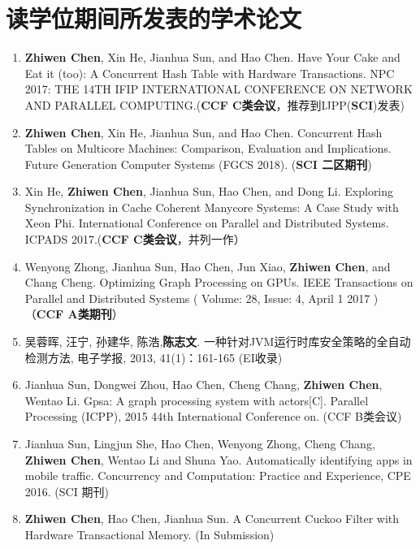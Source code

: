 \chapter{读学位期间所发表的学术论文}

\begin{enumerate}
\item \textbf{Zhiwen Chen}, Xin He, Jianhua Sun, and Hao Chen. Have Your Cake and Eat it (too): A Concurrent Hash Table with Hardware Transactions. NPC 2017: THE 14TH IFIP INTERNATIONAL CONFERENCE ON NETWORK AND PARALLEL COMPUTING.(\textbf{CCF C类会议}，推荐到IJPP(\textbf{SCI})发表)
\item \textbf{Zhiwen Chen}, Xin He, Jianhua Sun, and Hao Chen. Concurrent Hash Tables on Multicore Machines: Comparison, Evaluation and Implications. Future Generation Computer Systems (FGCS 2018). (\textbf{SCI 二区期刊})
\item Xin He, \textbf{Zhiwen Chen}, Jianhua Sun, Hao Chen, and Dong Li. Exploring Synchronization in Cache Coherent Manycore Systems: A Case Study with Xeon Phi. International Conference on Parallel and Distributed Systems. ICPADS 2017.(\textbf{CCF C类会议}，并列一作）
\item Wenyong Zhong, Jianhua Sun, Hao Chen, Jun Xiao, \textbf{Zhiwen Chen}, and Chang Cheng. Optimizing Graph Processing on GPUs. IEEE Transactions on Parallel and Distributed Systems ( Volume: 28, Issue: 4, April 1 2017 ) （\textbf{CCF A类期刊}）
\item 吴蓉晖, 汪宁, 孙建华, 陈浩,\textbf{陈志文}. 一种针对JVM运行时库安全策略的全自动检测方法, 电子学报, 2013, 41(1)：161-165 (EI收录)
\item Jianhua Sun, Dongwei Zhou, Hao Chen, Cheng Chang, \textbf{Zhiwen Chen}, Wentao Li. Gpsa: A graph processing system with actors[C]. Parallel Processing (ICPP), 2015 44th International Conference on. (CCF B类会议)
 \item Jianhua Sun, Lingjun She, Hao Chen, Wenyong Zhong, Cheng Chang, \textbf{Zhiwen Chen}, Wentao Li and Shuna Yao. Automatically identifying apps in mobile traffic. Concurrency and Computation: Practice and Experience, CPE 2016. (SCI 期刊)
 \item \textbf{Zhiwen Chen}, Hao Chen, Jianhua Sun. A Concurrent Cuckoo Filter with Hardware Transactional Memory. (In Submission)
\end{enumerate}


